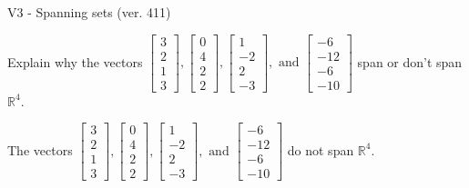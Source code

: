 \begin{exercise}
  \begin{exerciseTitle}V3 - Spanning sets (ver. 411)\end{exerciseTitle}
  \begin{exerciseStatement}
    Explain why the vectors \(\left[\begin{array}{r}
3 \\
2 \\
1 \\
3
\end{array}\right] , \left[\begin{array}{r}
0 \\
4 \\
2 \\
2
\end{array}\right] , \left[\begin{array}{r}
1 \\
-2 \\
2 \\
-3
\end{array}\right] , \text{ and } \left[\begin{array}{r}
-6 \\
-12 \\
-6 \\
-10
\end{array}\right]\) span or don't span \(\mathbb{R}^4\). 
	


  \end{exerciseStatement}
  \begin{exerciseAnswer}
   The vectors \(\left[\begin{array}{r}
3 \\
2 \\
1 \\
3
\end{array}\right] , \left[\begin{array}{r}
0 \\
4 \\
2 \\
2
\end{array}\right] , \left[\begin{array}{r}
1 \\
-2 \\
2 \\
-3
\end{array}\right] , \text{ and } \left[\begin{array}{r}
-6 \\
-12 \\
-6 \\
-10
\end{array}\right]\) 
  	 do not  
	span \(\mathbb{R}^4\).
  


  \end{exerciseAnswer}
\end{exercise}